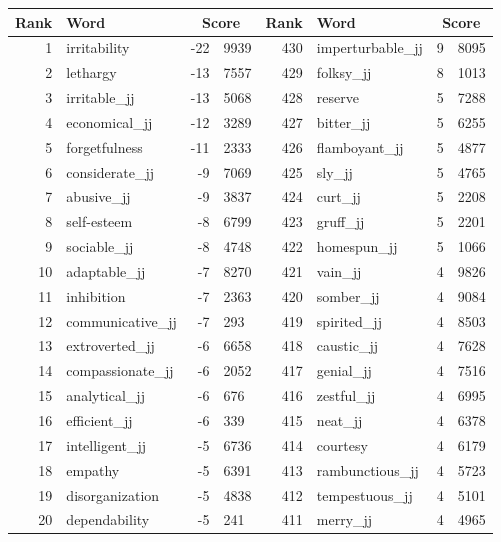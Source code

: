 \begin{table}[tbp]
    \begin{tabular}{| rlr@{.}l | rlr@{.}l |}
    \hline
    \textbf{Rank} & \textbf{Word} & \multicolumn{2}{c|}{\textbf{Score}} & \textbf{Rank} & \textbf{Word} & \multicolumn{2}{c|}{\textbf{Score}} \\
    \hline
    1 & irritability & -22 & 9939    &    430 & imperturbable\_jj & 9 & 8095 \\
    2 & lethargy & -13 & 7557    &    429 & folksy\_jj & 8 & 1013 \\
    3 & irritable\_jj & -13 & 5068    &    428 & reserve & 5 & 7288 \\
    4 & economical\_jj & -12 & 3289    &    427 & bitter\_jj & 5 & 6255 \\
    5 & forgetfulness & -11 & 2333    &    426 & flamboyant\_jj & 5 & 4877 \\
    6 & considerate\_jj & -9 & 7069    &    425 & sly\_jj & 5 & 4765 \\
    7 & abusive\_jj & -9 & 3837    &    424 & curt\_jj & 5 & 2208 \\
    8 & self-esteem & -8 & 6799    &    423 & gruff\_jj & 5 & 2201 \\
    9 & sociable\_jj & -8 & 4748    &    422 & homespun\_jj & 5 & 1066 \\
    10 & adaptable\_jj & -7 & 8270    &    421 & vain\_jj & 4 & 9826 \\
    11 & inhibition & -7 & 2363    &    420 & somber\_jj & 4 & 9084 \\
    12 & communicative\_jj & -7 & 293    &    419 & spirited\_jj & 4 & 8503 \\
    13 & extroverted\_jj & -6 & 6658    &    418 & caustic\_jj & 4 & 7628 \\
    14 & compassionate\_jj & -6 & 2052    &    417 & genial\_jj & 4 & 7516 \\
    15 & analytical\_jj & -6 & 676    &    416 & zestful\_jj & 4 & 6995 \\
    16 & efficient\_jj & -6 & 339    &    415 & neat\_jj & 4 & 6378 \\
    17 & intelligent\_jj & -5 & 6736    &    414 & courtesy & 4 & 6179 \\
    18 & empathy & -5 & 6391    &    413 & rambunctious\_jj & 4 & 5723 \\
    19 & disorganization & -5 & 4838    &    412 & tempestuous\_jj & 4 & 5101 \\
    20 & dependability & -5 & 241    &    411 & merry\_jj & 4 & 4965 \\

\end{tabular}
\end{table}
